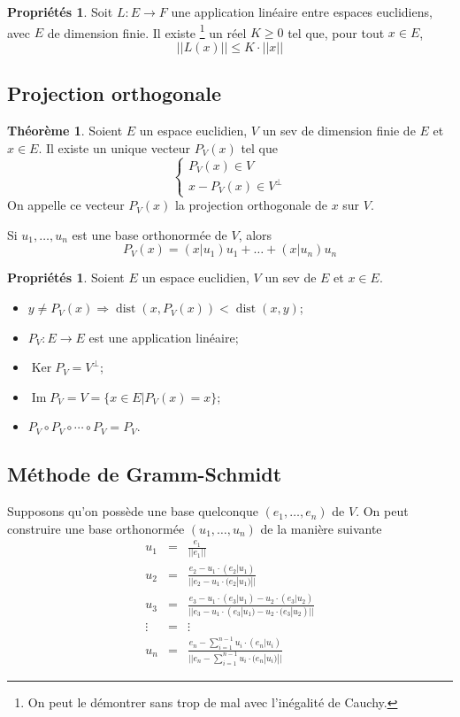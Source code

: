 \documentclass[11pt,a4paper]{article}
\theoremstyle{definition}
\newtheorem{myprop}[mydef]{Propriétés}
\newtheorem{mytheo}[mydef]{Théorème}
\DeclareMathOperator{\dist}{dist}
\DeclareMathOperator{\Ker}{Ker}
\DeclareMathOperator{\newIm}{Im}
\begin{document}
\begin{myprop}
	Soit $L : E \to F$ une application linéaire entre espaces euclidiens, avec $E$ de dimension finie.
	Il existe
	\footnote{On peut le démontrer sans trop de mal avec l'inégalité de Cauchy.}
	un réel $K \geq 0$ tel que, pour tout $x \in E$,
	\[ ||L(x)|| \leq K \cdot ||x|| \]
\end{myprop}

\subsection{Projection orthogonale}
\begin{mytheo}
	Soient $E$ un espace euclidien, $V$ un sev de dimension finie de $E$ et $x \in E$.
	Il existe un unique vecteur $P_V(x)$ tel que
	\[
	\left\{
	\begin{array}{l}
		P_V(x) \in V\\
		x - P_V(x) \in V^{\perp}
	\end{array}
	\right.
	\]
	On appelle ce vecteur $P_V(x)$ la projection orthogonale de $x$ sur $V$.

	Si $u_1, \ldots, u_n$ est une base orthonormée de $V$, alors
	\[ P_V(x) = (x|u_1)u_1 + \ldots + (x|u_n)u_n \]
\end{mytheo}

\begin{myprop}
	Soient $E$ un espace euclidien, $V$ un sev de $E$ et $x \in E$.
	\begin{itemize}
		\item $y \neq P_V(x) \Rightarrow \dist(x, P_V(x)) < \dist(x, y)$;
		\item $P_V : E \to E$ est une application linéaire;
		\item $\Ker P_V = V^{\perp}$;
		\item $\newIm P_V = V = \{x \in E | P_V(x) = x\}$;
		\item $P_V \circ P_V \circ \cdots \circ P_V = P_V$.
	\end{itemize}
\end{myprop}

\subsection{Méthode de Gramm-Schmidt}

Supposons qu'on possède une base quelconque $(e_1, \dots , e_n)$ de $V$.
On peut construire une base orthonormée $(u_1, \dots, u_n)$ de la manière suivante
\begin{eqnarray*}
	u_1 &=& \frac{e_1}{||e_1||}\\
	u_2 &=& \frac{e_2 - u_1 \cdot (e_2|u_1)}{||e_2 - u_1 \cdot (e_2|u_1)||}\\
	u_3 &=& \frac{e_3 - u_1 \cdot (e_3|u_1) - u_2 \cdot (e_3|u_2)}{||e_3 - u_1 \cdot (e_3|u_1) - u_2 \cdot (e_3|u_2)||}\\
	\vdots &=& \vdots\\
	u_n &=& \frac{e_n - \sum_{i=1}^{n-1} u_i \cdot (e_n|u_i) }{ || e_n - \sum_{i=1}^{n-1} u_i \cdot (e_n|u_i) || }
\end{eqnarray*}
\end{document}
